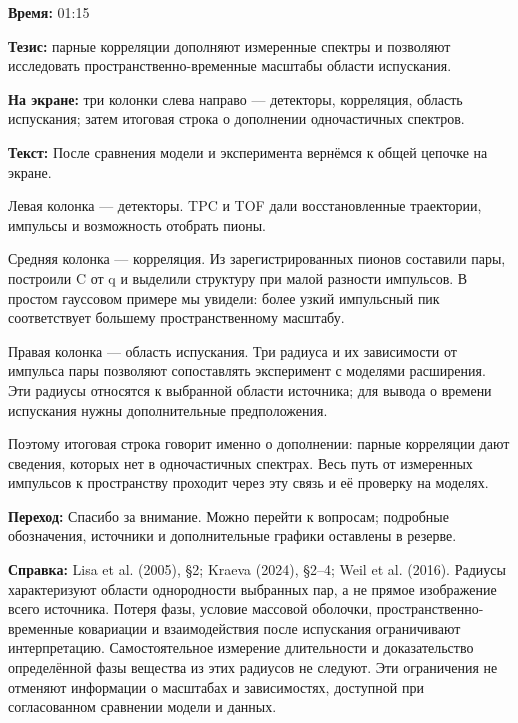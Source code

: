 \textbf{Время:} 01:15

\textbf{Тезис:} парные корреляции дополняют измеренные спектры и позволяют исследовать пространственно-временные масштабы области испускания.

\textbf{На экране:} три колонки слева направо — детекторы, корреляция, область испускания; затем итоговая строка о дополнении одночастичных спектров.

\textbf{Текст:} После сравнения модели и эксперимента вернёмся к общей цепочке на экране.

Левая колонка — детекторы. TPC и TOF дали восстановленные траектории, импульсы и возможность отобрать пионы.

Средняя колонка — корреляция. Из зарегистрированных пионов составили пары, построили C от q и выделили структуру при малой разности импульсов. В простом гауссовом примере мы увидели: более узкий импульсный пик соответствует большему пространственному масштабу.

Правая колонка — область испускания. Три радиуса и их зависимости от импульса пары позволяют сопоставлять эксперимент с моделями расширения. Эти радиусы относятся к выбранной области источника; для вывода о времени испускания нужны дополнительные предположения.

Поэтому итоговая строка говорит именно о дополнении: парные корреляции дают сведения, которых нет в одночастичных спектрах. Весь путь от измеренных импульсов к пространству проходит через эту связь и её проверку на моделях.

\textbf{Переход:} Спасибо за внимание. Можно перейти к вопросам; подробные обозначения, источники и дополнительные графики оставлены в резерве.

\textbf{Справка:} Lisa et al. (2005), §2; Kraeva (2024), §2–4; Weil et al. (2016). Радиусы характеризуют области однородности выбранных пар, а не прямое изображение всего источника. Потеря фазы, условие массовой оболочки, пространственно-временные ковариации и взаимодействия после испускания ограничивают интерпретацию. Самостоятельное измерение длительности и доказательство определённой фазы вещества из этих радиусов не следуют. Эти ограничения не отменяют информации о масштабах и зависимостях, доступной при согласованном сравнении модели и данных.
